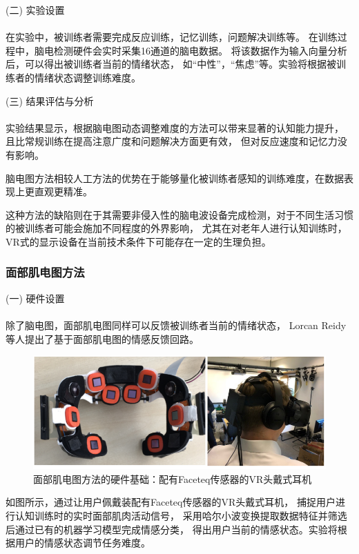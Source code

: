 \documentclass{article}
\begin{document}
            (二) 实验设置\paragraph{}
            在实验中，被训练者需要完成反应训练，记忆训练，问题解决训练等。
            在训练过程中，脑电检测硬件会实时采集16通道的脑电数据。
            将该数据作为输入向量分析后，可以得出被训练者当前的情绪状态，
            如“中性”，“焦虑”等。实验将根据被训练者的情绪状态调整训练难度。

            (三) 结果评估与分析\paragraph{}
            实验结果显示，根据脑电图动态调整难度的方法可以带来显著的认知能力提升，
            且比常规训练在提高注意广度和问题解决方面更有效，
            但对反应速度和记忆力没有影响。

            脑电图方法相较人工方法的优势在于能够量化被训练者感知的训练难度，在数据表现上更直观更精准。

            这种方法的缺陷则在于其需要非侵入性的脑电波设备完成检测，对于不同生活习惯的被训练者可能会施加不同程度的外界影响，
            尤其在对老年人进行认知训练时，VR式的显示设备在当前技术条件下可能存在一定的生理负担。


            \subsubsection{面部肌电图方法}
            (一) 硬件设置\paragraph{}
            除了脑电图，面部肌电图同样可以反馈被训练者当前的情绪状态，
            Lorcan Reidy\cite{ref15}等人提出了基于面部肌电图的情感反馈回路。
            \begin{figure}[H]
            	
            	\centering
            	\includegraphics[scale=0.8]{images/Faceteq.png}
            	\caption{面部肌电图方法的硬件基础：配有Faceteq传感器的VR头戴式耳机\cite{ref15}}
            	\label{fig:label}
            \end{figure}
            如图所示，通过让用户佩戴装配有Faceteq传感器的VR头戴式耳机，
            捕捉用户进行认知训练时的实时面部肌肉活动信号，
            采用哈尔小波变换提取数据特征并筛选后通过已有的机器学习模型完成情感分类，
            得出用户当前的情感状态。实验将根据用户的情感状态调节任务难度。
\end{document}
